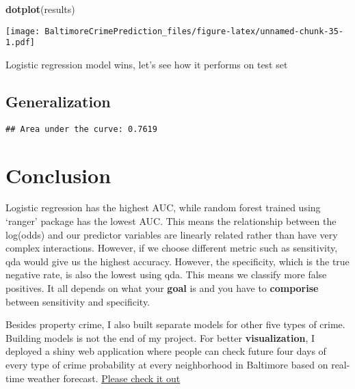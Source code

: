 \documentclass[]{article}
\newenvironment{Shaded}{\begin{snugshade}}{\end{snugshade}}
\newcommand{\KeywordTok}[1]{\textcolor[rgb]{0.13,0.29,0.53}{\textbf{#1}}}
\newcommand{\DataTypeTok}[1]{\textcolor[rgb]{0.13,0.29,0.53}{#1}}
\newcommand{\StringTok}[1]{\textcolor[rgb]{0.31,0.60,0.02}{#1}}
\newcommand{\OperatorTok}[1]{\textcolor[rgb]{0.81,0.36,0.00}{\textbf{#1}}}
\newcommand{\NormalTok}[1]{#1}
\begin{document}
\begin{Shaded}
\begin{Highlighting}[]
\KeywordTok{dotplot}\NormalTok{(results)}
\end{Highlighting}
\end{Shaded}

\texttt{[image: BaltimoreCrimePrediction\_files/figure-latex/unnamed-chunk-35-1.pdf]}

Logistic regression model wins, let's see how it performs on test set

\subsection{Generalization}\label{generalization}

\begin{Shaded}
\end{Shaded}

\begin{verbatim}
## Area under the curve: 0.7619
\end{verbatim}

\section{Conclusion}\label{conclusion}

Logistic regression has the highest AUC, while random forest trained
using `ranger' package has the lowest AUC. This means the relationship
between the log(odds) and our predictor variables are linearly related
rather than have very complex interactions. However, if we choose
different metric such as sensitivity, qda would give us the highest
accuracy. However, the specificity, which is the true negative rate, is
also the lowest using qda. This means we classify more false positives.
It all depends on what your \textbf{goal} is and you have to
\textbf{comporise} between sensitivity and specificity.

Besides property crime, I also built separate models for other five
types of crime. Building models is not the end of my project. For better
\textbf{visualization}, I deployed a shiny web application where people
can check future four days of every type of crime probability at every
neighborhood in Baltimore based on real-time weather forecast.
\href{https://xuyangjhu.shinyapps.io/BaltimoreCrime/}{Please check it
out}
\end{document}
